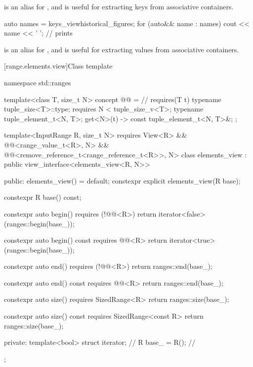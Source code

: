 \pnum
{} is an alias for , and
is useful for extracting keys from associative containers.

\begin{example}
\begin{codeblock}
auto names = keys_view{historical_figures};
for (auto&& name : names) {
  cout << name << ' ';          // prints 
}
\end{codeblock}
\end{example}

\pnum
{} is an alias for , and
is useful for extracting values from associative containers.

\begin{example}
\end{example}

[range.elements.view]{Class template }

%
\begin{codeblock}
namespace std::ranges {
  template<class T, size_t N>
  concept @@ =                   // \expos
    requires(T t) {
      typename tuple_size<T>::type;
      requires N < tuple_size_v<T>;
      typename tuple_element_t<N, T>;
      { get<N>(t) } -> const tuple_element_t<N, T>&;
    };


  template<InputRange R, size_t N>
    requires View<R> && @@<range_value_t<R>, N> &&
      @@<remove_reference_t<range_reference_t<R>>, N>
  class elements_view : public view_interface<elements_view<R, N>> {
  public:
    elements_view() = default;
    constexpr explicit elements_view(R base);

    constexpr R base() const;

    constexpr auto begin() requires (!@@<R>)
    { return iterator<false>(ranges::begin(base_)); }

    constexpr auto begin() const requires @@<R>
    { return iterator<true>(ranges::begin(base_)); }

    constexpr auto end() requires (!@@<R>)
    { return ranges::end(base_); }

    constexpr auto end() const requires @@<R>
    { return ranges::end(base_); }

    constexpr auto size() requires SizedRange<R>
    { return ranges::size(base_); }

    constexpr auto size() const requires SizedRange<const R>
    { return ranges::size(base_); }

  private:
    template<bool> struct iterator;                     // \expos
    R base_ = R();                                      // \expos
  };
}
\end{codeblock}

